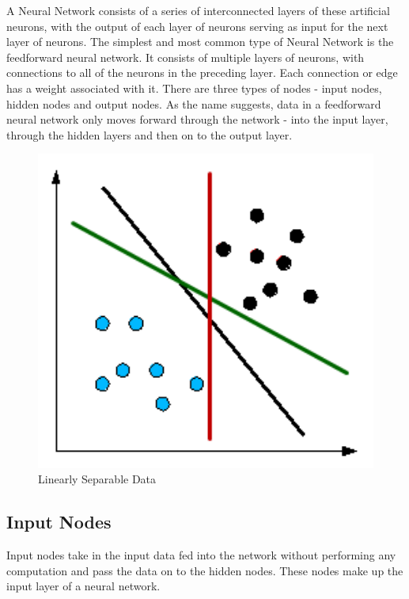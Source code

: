 \documentclass[12pt]{report}
\begin{document}
\begin{flushleft}
A Neural Network consists of a series of interconnected layers of these artificial neurons, with the output of each layer of neurons serving as input for the next layer of neurons. The simplest and most common type of Neural Network is the feedforward neural network. It consists of multiple layers of neurons, with connections to all of the neurons in the preceding layer. Each connection or edge has a weight associated with it. There are three types of nodes - input nodes, hidden nodes and output nodes. As the name suggests, data in a feedforward neural network only moves forward through the network - into the input layer, through the hidden layers and then on to the output layer.
\end{flushleft}

\vspace{0.5cm}
\begin{figure}[h]
	\centering
	\includegraphics[width=12cm]{linear}
	\caption{Linearly Separable Data}
	\label{fig:linear}
\end{figure}

\subsection{Input Nodes}
\begin{flushleft}
Input nodes take in the input data fed into the network without performing any computation and pass the data on to the hidden nodes. These nodes make up the input layer of a neural network.
\end{flushleft}
\end{document}
